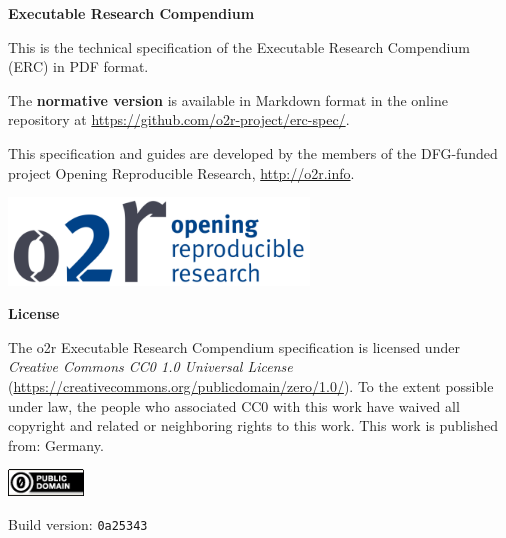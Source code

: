 \begin{titlepage}
    {\raggedleft
        \textbf{\Large Executable Research Compendium}\\
    }
    \vspace{\fill}
	
    This is the technical specification of the Executable Research Compendium (ERC) in PDF format.

    The \textbf{normative version} is available in Markdown format in the online repository at \url{https://github.com/o2r-project/erc-spec/}.

    This specification and guides are developed by the members of the DFG-funded project Opening Reproducible Research, \url{http://o2r.info}.

    \vspace{1cm}
    \begin{center}
        \includegraphics[width=8cm]{docs/o2r-logo}
    \end{center}
    \vspace{3cm}

    \textbf{License}

    The o2r Executable Research Compendium specification is licensed under \emph{Creative Commons CC0 1.0 Universal License} (\url{https://creativecommons.org/publicdomain/zero/1.0/}).
    To the extent possible under law, the people who associated CC0 with this work have waived all copyright and related or neighboring rights to this work.
    This work is published from: Germany.

    \includegraphics[width=2cm]{docs/cc-zero}

    Build version: \texttt{0a25343}
 
\end{titlepage}
